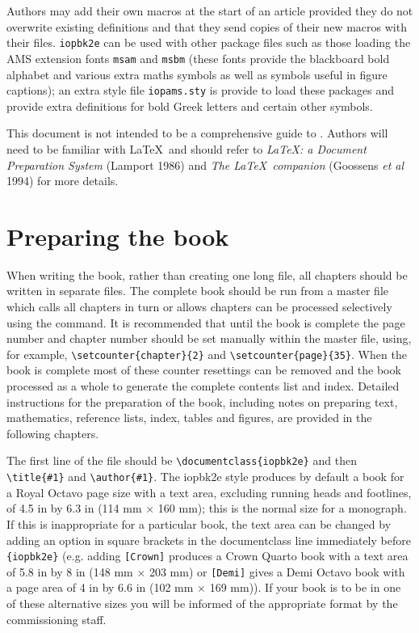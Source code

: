 \documentclass{iopbk2e}
\begin{document}
Authors may add their own macros 
at the start of an article 
provided they do not overwrite existing definitions and 
that they send copies of their new macros with their files.
\verb"iopbk2e" can be used with other package files such
as those loading the AMS extension fonts 
\verb"msam" and \verb"msbm" (these fonts provide the 
blackboard bold alphabet 
and various extra maths symbols as well as symbols useful in figure 
captions); an extra style file \verb"iopams.sty" is provide to load these
packages and provide extra definitions for bold Greek letters and certain
other symbols.

This document is not intended to be a comprehensive guide to \LaTeXe. 
Authors will need to be familiar with \LaTeX\ and should 
refer to {\em \LaTeX: a Document Preparation System\/} (Lamport 1986) and 
{\em The \LaTeX\ companion\/} (Goossens {\it et al\/} 1994)
for more details.

\section{Preparing the book}
When writing the book, rather than creating one long file, 
all chapters should be written in separate 
files. The complete book should be run from a master 
file which calls all chapters 
in turn or allows chapters can be processed selectively using the 
\verb"" command.
It is recommended that until the book is complete  
the page number and chapter number should be set manually 
within the master file, 
using, for example, \verb"\setcounter{chapter}{2}" and
\verb"\setcounter{page}{35}". 
When the book is complete most of these
counter resettings can be removed and the book processed as a whole
to generate the complete contents list and 
index.
Detailed instructions for the preparation of the book, including notes 
on preparing text, mathematics, reference lists, index, tables and figures, 
are provided in the following chapters.

The first line of the file should be \verb"\documentclass{iopbk2e}"
and then \verb"\title{#1}" and \verb"\author{#1}".
The iopbk2e style produces by default a book for a 
Royal Octavo page size with a text
area, excluding running heads and footlines, of 4.5 in by 6.3 in (114 mm
$\times$ 160 mm); this is
the normal size for a monograph. 
If this is inappropriate for a particular book, the text area can be
changed by adding an option in square brackets in the documentclass line
immediately before \verb"{iopbk2e}"
(e.g. adding \verb"[Crown]" produces a
Crown Quarto book with a text area of 5.8 in by 8 in (148 mm
$\times$ 203 mm) or \verb"[Demi]"
gives a Demi Octavo book with a page area of 4 in by 6.6
in (102 mm $\times$ 169 mm)). If your book is to be in one of these alternative sizes you will be 
informed of the appropriate format by the commissioning staff.
\end{document}
